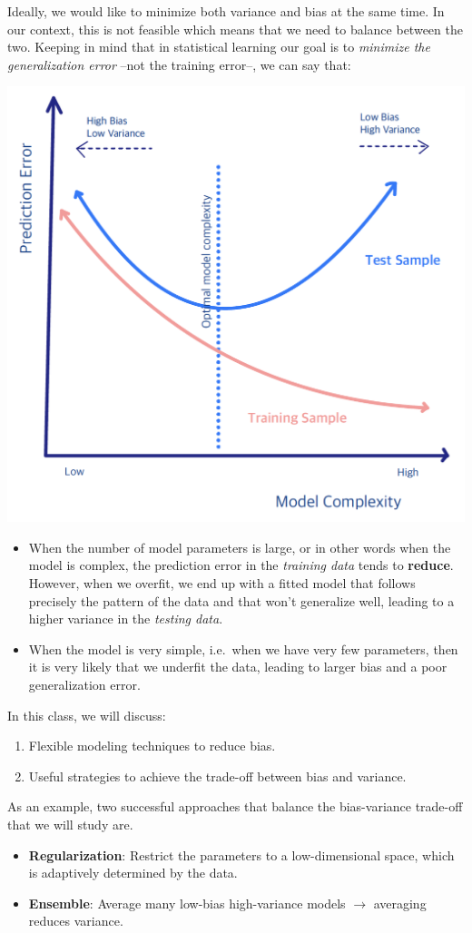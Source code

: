 \documentclass[
]{book}
\begin{document}
Ideally, we would like to minimize both variance and bias at the same time. In our context, this is not feasible which means that we need to balance between the two. Keeping in mind that in statistical learning our goal is to \emph{minimize the generalization error} --not the training error--, we can say that:

\begin{center}\includegraphics[width=0.5\linewidth]{images/week1/traintest2} \end{center}

\begin{itemize}
\item
  When the number of model parameters is large, or in other words when the model is complex, the prediction error in the \emph{training data} tends to \textbf{reduce}. However, when we overfit, we end up with a fitted model that follows precisely the pattern of the data and that won't generalize well, leading to a higher variance in the \emph{testing data}.
\item
  When the model is very simple, i.e.~when we have very few parameters, then it is very likely that we underfit the data, leading to larger bias and a poor generalization error.
\end{itemize}

In this class, we will discuss:

\begin{enumerate}
\def\labelenumi{(\roman{enumi})}
\item
  Flexible modeling techniques to reduce bias.
\item
  Useful strategies to achieve the trade-off between bias and variance.
\end{enumerate}

As an example, two successful approaches that balance the bias-variance trade-off that we will study are.

\begin{itemize}
\item
  \textbf{Regularization}: Restrict the parameters to a low-dimensional space, which is adaptively determined by the data.
\item
  \textbf{Ensemble}: Average many low-bias high-variance models \(\longrightarrow\) averaging reduces variance.
\end{itemize}
\end{document}
